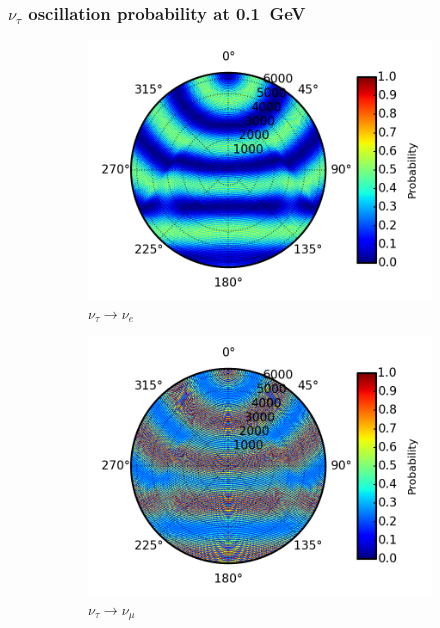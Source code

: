 \documentclass{beamer}
\begin{document}
\begin{frame}
	\frametitle{$\nu_{\tau}$ oscillation probability at \SI{0.1}{GeV}}
	\begin{figure}
		\centering
		\begin{subfigure}[b]{0.33\linewidth}
			\caption{ $\nu_{\tau} \rightarrow \nu_{e}$ }
			\includegraphics[width=\linewidth]{earth_0.1gev_nutau2nue_throughEarth.png}
		\end{subfigure}
		\begin{subfigure}[b]{0.33\linewidth}
			\caption{ $\nu_{\tau} \rightarrow \nu_{\mu}$ }
			\includegraphics[width=\linewidth]{earth_0.1gev_nutau2numu_throughEarth.png}
		\end{subfigure}
		\begin{subfigure}[b]{0.33\linewidth}

\end{subfigure}
\end{figure}
\end{frame}
\end{document}
